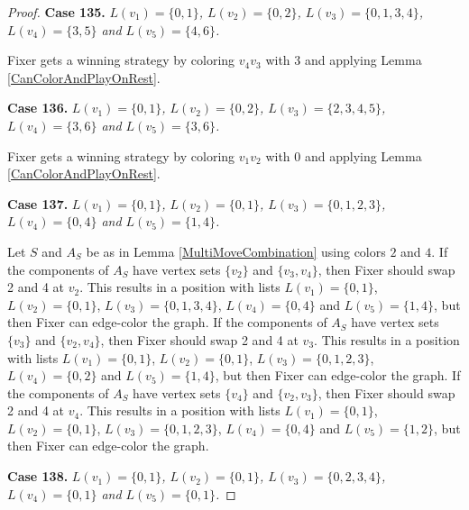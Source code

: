 \documentclass[12pt]{amsart}
\theoremstyle{plain}
\theoremstyle{definition}
\theoremstyle{remark}
\begin{document}
\begin{proof}
\noindent\textbf{Case 135.  }\textit{$L(v_1) = \{0, 1\}$, $L(v_2) = \{0, 2\}$, $L(v_3) = \{0, 1, 3, 4\}$, $L(v_4) = \{3, 5\}$ and $L(v_5) = \{4, 6\}$.}

Fixer gets a winning strategy by coloring $v_4v_3$ with $3$ and applying Lemma \ref{CanColorAndPlayOnRest}.

\noindent\textbf{Case 136.  }\textit{$L(v_1) = \{0, 1\}$, $L(v_2) = \{0, 2\}$, $L(v_3) = \{2, 3, 4, 5\}$, $L(v_4) = \{3, 6\}$ and $L(v_5) = \{3, 6\}$.}

Fixer gets a winning strategy by coloring $v_1v_2$ with $0$ and applying Lemma \ref{CanColorAndPlayOnRest}.

\noindent\textbf{Case 137.  }\textit{$L(v_1) = \{0, 1\}$, $L(v_2) = \{0, 1\}$, $L(v_3) = \{0, 1, 2, 3\}$, $L(v_4) = \{0, 4\}$ and $L(v_5) = \{1, 4\}$.}

Let $S$ and $A_S$ be as in Lemma \ref{MultiMoveCombination} using colors $2$ and $4$. If the components of $A_S$ have vertex sets $\{v_2\}$ and $\{v_3, v_4\}$, then Fixer should swap 2 and 4 at $v_2$. This results in a position with lists $L(v_1) = \{0, 1\}$, $L(v_2) = \{0, 1\}$, $L(v_3) = \{0, 1, 3, 4\}$, $L(v_4) = \{0, 4\}$ and $L(v_5) = \{1, 4\}$, but then Fixer can edge-color the graph. If the components of $A_S$ have vertex sets $\{v_3\}$ and $\{v_2, v_4\}$, then Fixer should swap 2 and 4 at $v_3$. This results in a position with lists $L(v_1) = \{0, 1\}$, $L(v_2) = \{0, 1\}$, $L(v_3) = \{0, 1, 2, 3\}$, $L(v_4) = \{0, 2\}$ and $L(v_5) = \{1, 4\}$, but then Fixer can edge-color the graph. If the components of $A_S$ have vertex sets $\{v_4\}$ and $\{v_2, v_3\}$, then Fixer should swap 2 and 4 at $v_4$. This results in a position with lists $L(v_1) = \{0, 1\}$, $L(v_2) = \{0, 1\}$, $L(v_3) = \{0, 1, 2, 3\}$, $L(v_4) = \{0, 4\}$ and $L(v_5) = \{1, 2\}$, but then Fixer can edge-color the graph. 

\noindent\textbf{Case 138.  }\textit{$L(v_1) = \{0, 1\}$, $L(v_2) = \{0, 1\}$, $L(v_3) = \{0, 2, 3, 4\}$, $L(v_4) = \{0, 1\}$ and $L(v_5) = \{0, 1\}$.}


\end{proof}
\end{document}
